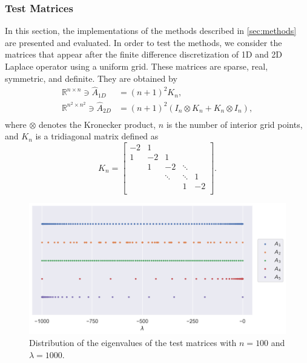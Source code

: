 \subsubsection*{Test Matrices}

In this section, the implementations of the methods described in \autoref{sec:methods}
are presented and evaluated. In order to test the methods, we consider the matrices that appear
after the finite difference discretization of 1D and 2D Laplace operator using a uniform grid.
These matrices are sparse, real, symmetric, and definite.
They are obtained by
\begin{equation*}
    \begin{aligned}
        \mathbb{R}^{n \times n} \ni \hat{A}_{1D} & = (n+1)^2 K_n,\\
        \mathbb{R}^{n^2 \times n^2} \ni \hat{A}_{2D} & = (n+1)^2  (I_n \otimes K_n + K_n \otimes I_n),\\
        \end{aligned}
\end{equation*}
where $\otimes$ denotes the Kronecker product, $n$ is the number of interior
grid points, and $K_n$ is a tridiagonal matrix defined as
\begin{equation*}
    K_n =
    \begin{bmatrix}
        -2 & 1 &  &  &  \\
        1 & -2 & 1 &  &  \\
         & 1 & -2 & \ddots &  \\
         &  & \ddots & \ddots & 1 \\
         &  &  & 1 & -2  \\
    \end{bmatrix}.
\end{equation*}

\begin{figure}[ht!]
    \centering
    \includegraphics[width=.8\textwidth]{img/eigvals.png}
    \caption{
        Distribution of the eigenvalues of the test matrices with $n=100$ and
        $\lambda = 1000$.
    }
    \label{fig:eigenvaluedistributions}
\end{figure}


